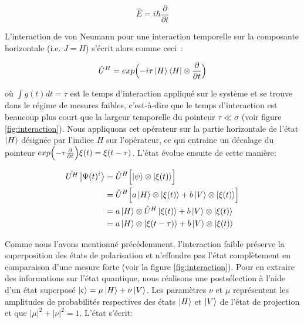 \begin{onehalfspace}
    \begin{equation}
        \hat{E} = i\hbar\frac{\partial}{\partial t}
    \end{equation}

    \noindent L’interaction de von Neumann pour une interaction 
    temporelle sur la composante horizontale (i.e. $J=H$) s’écrit alors comme ceci :

    \begin{equation}
        \hat{U}^H = exp\Bigl(-i\tau\ket{H}\bra{H} \otimes \frac{\partial}{\partial t}\Bigr)
    \end{equation}

    \noindent où $\int g(t) dt = \tau$ est le temps d’interaction appliqué sur le système
    et se trouve dans le régime de 
    mesures faibles, c'est-à-dire que le temps d'interaction 
    est beaucoup plus court que 
    la largeur temporelle du pointeur $\tau \ll \sigma$ (voir figure \ref{fig:interaction}). 
    Nous appliquons cet opérateur sur la partie horizontale de l’état $\ket{H}$
    désignée par l'indice $H$ sur l'opérateur, ce qui entraine un décalage du 
    pointeur $exp\Bigl( -\tau \frac{\partial }{\partial t} \Bigr) \xi(t) = \xi(t-\tau)$. 
    L’état évolue ensuite de cette manière:

    \begin{align}
        \hat{U^H}\ket{\Psi(t)^i} &= \hat{U}^H \Bigl[ \ket{\psi} \otimes \ket{\xi(t)} \Bigr]\\
        &= \hat{U}^H \Bigl[ a\ket{H} \otimes \ket{\xi(t)} + b\ket{V} \otimes \ket{\xi(t)}\Bigr]\\
        &= a\ket{H} \otimes \hat{U}^H \ket{\xi(t)} + b\ket{V} \otimes \ket{\xi(t)}\\
        &= a\ket{H} \otimes \ket{\xi(t-\tau)} + b\ket{V} \otimes \ket{\xi(t)}
    \end{align}

    \noindent Comme nous l’avons mentionné précédemment, 
    l’interaction faible préserve la superposition des états de polarisation 
    et n'effondre pas l'état complètement en comparaison 
    d'une mesure forte (voir la figure \ref{fig:interaction}).
    Pour en extraire des informations sur l'état quantique, nous réalisons 
    une postsélection à 
    l’aide d'un état superposé $\ket{\varsigma} = \mu\ket{H} + \nu\ket{V}$. 
    Les paramètres $\nu$ et $\mu$ représentent les amplitudes de 
    probabilités respectives des états $\ket{H}$ et $\ket{V}$ de l'état 
    de projection et que $|\mu|^2 + |\nu|^2 = 1$. L'état s'écrit:


\end{onehalfspace}
